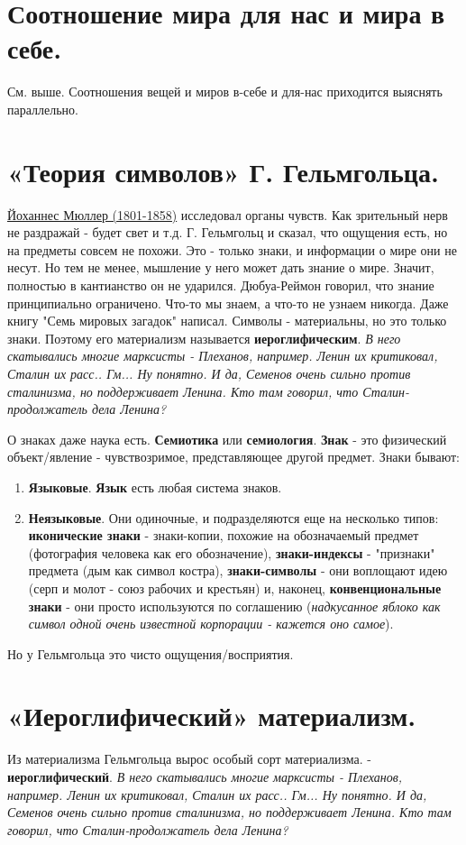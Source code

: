 \section{ Соотношение мира для нас и мира в себе.}
См. выше. Соотношения вещей и миров в-себе и для-нас приходится выяснять параллельно.

\section{ «Теория символов» Г. Гельмгольца.}
\underline{Йоханнес Мюллер (1801-1858)} исследовал органы чувств. Как зрительный нерв не раздражай - будет свет и т.д. 
Г. Гельмгольц и сказал, что ощущения есть, но на предметы совсем не похожи. Это - только знаки, и информации о мире они не несут. Но тем не менее, мышление у него может дать знание о мире. Значит, полностью в кантианство он не ударился. Дюбуа-Реймон говорил, что знание принципиально ограничено. Что-то мы знаем, а что-то не узнаем никогда. Даже книгу "Семь мировых загадок" написал. Символы - материальны, но это только знаки. Поэтому его материализм называется \textbf{иероглифическим}. \textit{В него скатывались многие марксисты - Плеханов, например. Ленин их критиковал, Сталин их расс.. Гм... Ну понятно. И да, Семенов очень сильно против сталинизма, но поддерживает Ленина. Кто там говорил, что Сталин-продолжатель дела Ленина?}

О знаках даже наука есть. \textbf{Семиотика} или \textbf{семиология}. \textbf{Знак} - это физический объект/явление - чувствозримое, представляющее другой предмет. Знаки бывают:
\begin{enumerate}
\item \textbf{Языковые}. \textbf{Язык} есть любая система знаков.
\item \textbf{Неязыковые}. Они одиночные, и подразделяются еще на несколько типов: \textbf{иконические знаки} - знаки-копии, похожие на обозначаемый предмет (фотография человека как его обозначение), \textbf{знаки-индексы} - "признаки" предмета (дым как символ костра), \textbf{знаки-символы} - они воплощают идею (серп и молот - союз рабочих и крестьян) и, наконец, \textbf{конвенциональные знаки} - они просто используются по соглашению (\textit{надкусанное яблоко как символ одной очень известной корпорации - кажется оно самое}). 
\end{enumerate}

Но у Гельмгольца это чисто ощущения/восприятия.

\section{ «Иероглифический» материализм.}
Из материализма Гельмгольца вырос особый сорт материализма. - \textbf{иероглифический}. \textit{В него скатывались многие марксисты - Плеханов, например. Ленин их критиковал, Сталин их расс.. Гм... Ну понятно. И да, Семенов очень сильно против сталинизма, но поддерживает Ленина. Кто там говорил, что Сталин-продолжатель дела Ленина?}

